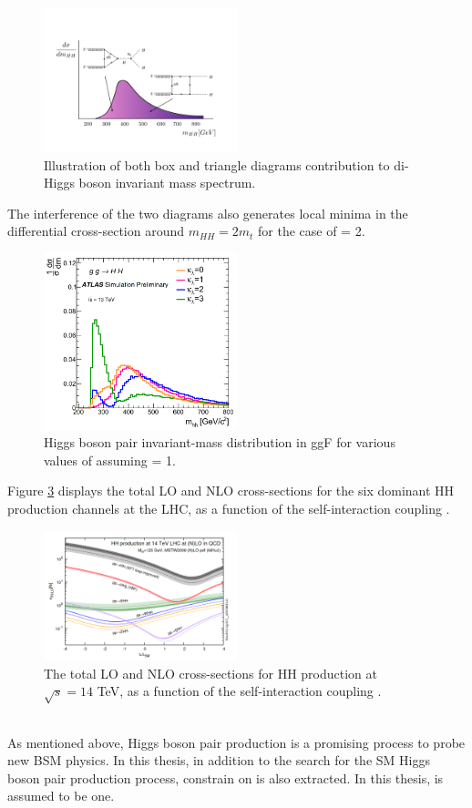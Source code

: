 \begin{figure}[htbp]
    \centering
    \includegraphics[width=0.5\textwidth]{Ch1/Img/illustration_mHH.jpeg}
    \caption{Illustration of both box and triangle diagrams contribution to di-Higgs boson invariant mass spectrum.}
    \label{fig:chap1:HH:BSM:I}
\end{figure}
The interference of the two diagrams also generates local minima in the differential cross-section around $m_{HH}=2m_t$ for the case of \kl = 2.
\begin{figure}[htbp]
    \centering
    \includegraphics[width=0.5\textwidth]{Ch1/Img/mHH.png}
    \caption{Higgs boson pair invariant-mass distribution in ggF for various values of \kl assuming \kt = 1.}
    \label{fig:chap1:HH:BSM:MHH}
\end{figure}
Figure \ref{fig:chap1:HH:BSM:XSEC:L} displays the total LO and NLO cross-sections for the six dominant HH production channels at the LHC, as a function of the self-interaction coupling \kl.
\begin{figure}[htbp]
    \centering
    \includegraphics[width=0.5\textwidth]{Ch1/Img/HH_Xsec_as_lambda.png}
    \caption{The total LO and NLO cross-sections for HH production at $\sqrt{s}=14$ TeV, as a function of the self-interaction coupling \kl.}
    \label{fig:chap1:HH:BSM:XSEC:L}
\end{figure}
\\
As mentioned above, Higgs boson pair production is a promising process to probe new BSM physics. In this thesis, in addition to the search for the SM Higgs boson pair production process, constrain on \kl is also extracted. In this thesis, \kt is assumed to be one.

